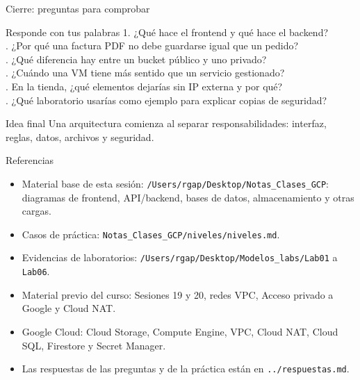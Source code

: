 \documentclass[aspectratio=169,10pt,c]{beamer}
\begin{document}
\begin{frame}{Cierre: preguntas para comprobar}
\begin{block}{Responde con tus palabras}
\small
1. ¿Qué hace el frontend y qué hace el backend?\\. ¿Por qué una factura PDF no debe guardarse igual que un pedido?\\. ¿Qué diferencia hay entre un bucket público y uno privado?\\. ¿Cuándo una VM tiene más sentido que un servicio gestionado?\\. En la tienda, ¿qué elementos dejarías sin IP externa y por qué?\\. ¿Qué laboratorio usarías como ejemplo para explicar copias de seguridad?
\end{block}
\begin{alertblock}{Idea final}
\small Una arquitectura comienza al separar responsabilidades: interfaz, reglas, datos, archivos y seguridad.
\end{alertblock}
\end{frame}

\begin{frame}{Referencias}
\scriptsize
\begin{itemize}\setlength\itemsep{4pt}
  \item Material base de esta sesión: \texttt{/Users/rgap/Desktop/Notas\_Clases\_GCP}: diagramas de frontend, API/backend, bases de datos, almacenamiento y otras cargas.
  \item Casos de práctica: \texttt{Notas\_Clases\_GCP/niveles/niveles.md}.
  \item Evidencias de laboratorios: \texttt{/Users/rgap/Desktop/Modelos\_labs/Lab01} a \texttt{Lab06}.
  \item Material previo del curso: Sesiones 19 y 20, redes VPC, Acceso privado a Google y Cloud NAT.
  \item Google Cloud: Cloud Storage, Compute Engine, VPC, Cloud NAT, Cloud SQL, Firestore y Secret Manager.
  \item Las respuestas de las preguntas y de la práctica están en \texttt{../respuestas.md}.
\end{itemize}
\end{frame}
\end{document}
